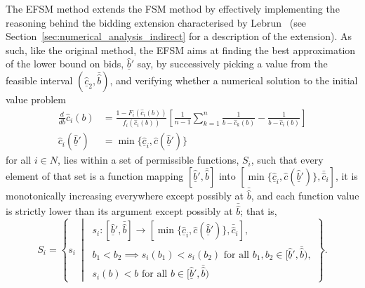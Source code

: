 The EFSM method extends the FSM method by effectively implementing the reasoning behind the bidding extension characterised by Lebrun~\cite{Lebrun2006} (see Section~\ref{sec:numerical_analysis_indirect} for a description of the extension). As such, like the original method, the EFSM aims at finding the best approximation of the lower bound on bids, $\underline{\hat{b}}'$ say, by successively picking a value from the feasible interval $(\underline{\hat{c}}_2,\bar{\hat{b}})$, and verifying whether a numerical solution to the initial value problem
\begin{equation}
  \label{eq:efsm_initial_value_problem_indirect}
  \begin{array}{ll}
    \displaystyle\frac{d}{db}\hat{c}_i(b) &= \displaystyle\frac{1 - F_i(\hat{c}_i(b))}{f_i(\hat{c}_i(b))}\left[ \frac{1}{n-1}\sum_{k=1}^n\frac{1}{b - \hat{c}_k(b)} - \frac{1}{b - \hat{c}_i(b)} \right] \\[2ex]
    \hat{c}_i(\underline{\hat{b}}') &= \min\{\underline{\hat{c}}_i, \hat{c}(\underline{\hat{b}}')\}
  \end{array}
\end{equation}
for all $i\in N$, lies within a set of permissible functions, $S_i$, such that every element of that set is a function mapping $[\underline{\hat{b}}',\bar{\hat{b}}]$ into $[\min\{\underline{\hat{c}}_i, \hat{c}(\underline{\hat{b}}')\}, \bar{\hat{c}}_i]$, it is monotonically increasing everywhere except possibly at $\bar{\hat{b}}$, and each function value is strictly lower than its argument except possibly at $\bar{\hat{b}}$; that is,
\begin{equation*}
  S_i=\left\{s_i \:\middle\vert\:
  \begin{array}{l}
    s_i: [\underline{\hat{b}}', \bar{\hat{b}}]\to [\min\{\underline{\hat{c}}_i, \hat{c}(\underline{\hat{b}}')\}, \bar{\hat{c}}_i],\\
    b_1 < b_2\implies s_i(b_1) < s_i(b_2) \textrm{ for all }b_1,b_2\in [\underline{\hat{b}}', \bar{\hat{b}}),\\
    s_i(b) < b \textrm{ for all }b\in [\underline{\hat{b}}', \bar{\hat{b}})
  \end{array}
  \right\}.
\end{equation*}

